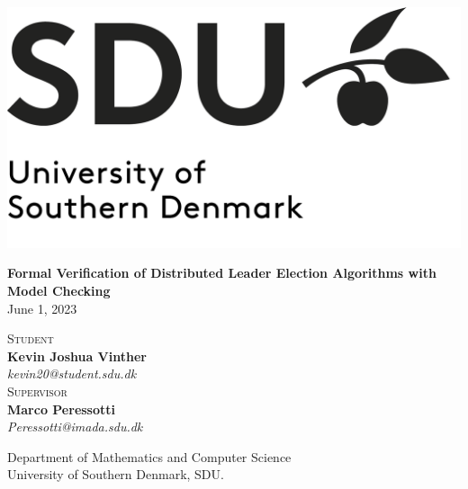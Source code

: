 \documentclass{report}
\begin{document}
\begin{center}

       \includegraphics[scale=0.3]{sdu.png}

       \vspace*{1cm}
       \textbf{\Large Formal Verification of Distributed Leader Election Algorithms with Model Checking}\\
       \vspace{0.4cm}
       June 1, 2023

       \vspace{0.5cm}

       \vspace{1.5cm}
       \begin{multicols}{2}
       \textsc{Student}\\
       \textbf{Kevin Joshua Vinther}\\
       \textit{kevin20@student.sdu.dk}
       \vspace{0.5cm}
       \\
       \textsc{Supervisor}\\
       \textbf{Marco Peressotti}\\
       \textit{Peressotti@imada.sdu.dk}
       \end{multicols}
       \vspace{2cm}

       \vfill
       Department of Mathematics and Computer Science \\
       University of Southern Denmark, SDU.


       \vspace{0.8cm}

\end{center}

\thispagestyle{empty}

\newpage

\setcounter{page}{1}
\end{document}
